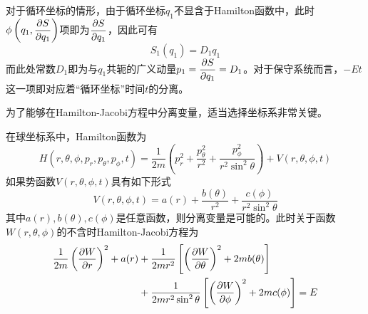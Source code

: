 对于循环坐标的情形，由于循环坐标$q_1$不显含于Hamilton函数中，此时$\phi\left(q_1,\dfrac{\partial S}{\partial q_1}\right)$项即为$\dfrac{\partial S}{\partial q_1}$，因此可有
\begin{equation*}
	S_1(q_1) = D_1q_1
\end{equation*}
而此处常数$D_1$即为与$q_1$共轭的广义动量$p_1=\dfrac{\partial S}{\partial q_1}=D_1$。对于保守系统而言，$-Et$这一项即对应着“循环坐标”时间$t$的分离。

为了能够在Hamilton-Jacobi方程中分离变量，适当选择坐标系非常关键。

\begin{example}
在球坐标系中，Hamilton函数为
\begin{equation}
	H(r,\theta,\phi,p_r,p_\theta,p_\phi,t) = \frac{1}{2m}\left(p_r^2+\frac{p_\theta^2}{r^2}+\frac{p_\phi^2}{r^2\sin^2\theta}\right)+V(r,\theta,\phi,t)
	\label{球坐标系中Hamilton-Jacobi方程的分离变量-1.1}
\end{equation}
如果势函数$V(r,\theta,\phi,t)$具有如下形式
\begin{equation}
	V(r,\theta,\phi,t) = a(r)+\frac{b(\theta)}{r^2}+\frac{c(\phi)}{r^2\sin^2\theta}
	\label{球坐标系中Hamilton-Jacobi方程的分离变量-1.2}
\end{equation}
其中$a(r),b(\theta),c(\phi)$是任意函数，则分离变量是可能的。此时关于函数$W(r,\theta,\phi)$的不含时Hamilton-Jacobi方程为
\begin{align}
	\frac{1}{2m}\left(\frac{\partial W}{\partial r}\right)^2+a(r)& {}+\frac{1}{2mr^2}\left[\left(\frac{\partial W}{\partial \theta}\right)^2+2mb(\theta)\right] \nonumber \\
	& {}+ \frac{1}{2mr^2\sin^2\theta}\left[\left(\frac{\partial W}{\partial \phi}\right)^2+2mc(\phi)\right] = E
	\label{球坐标系中Hamilton-Jacobi方程的分离变量-2}
\end{align}


\end{example}
